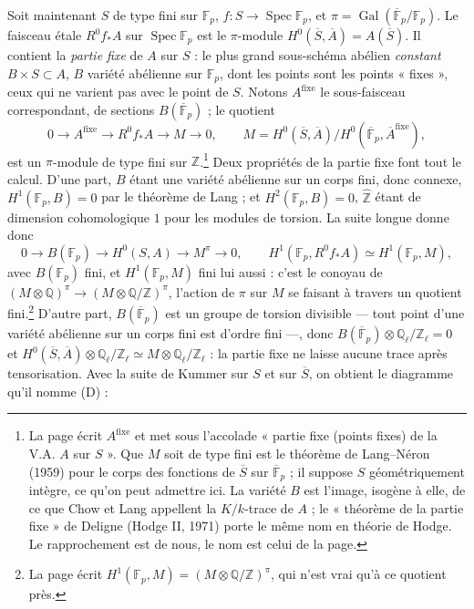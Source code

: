 \documentclass[11pt,a4paper]{article}
\begin{document}
Soit maintenant $S$ de type fini sur $\mathbb{F}_{p}$, $f \colon S \to
\operatorname{Spec}\mathbb{F}_{p}$, et $\pi = \operatorname{Gal}(
\overline{\mathbb{F}}_{p}/\mathbb{F}_{p})$. Le faisceau étale $R^{0}f_{*}A$ sur
$\operatorname{Spec}\mathbb{F}_{p}$ est le $\pi$-module $H^{0}(\overline{S},
\overline{A}) = A(\overline{S})$. Il contient la \emph{partie fixe} de $A$ sur
$S$ : le plus grand sous-schéma abélien \emph{constant} $B \times S \subset A$,
$B$ variété abélienne sur $\mathbb{F}_{p}$, dont les points sont les points
« fixes », ceux qui ne varient pas avec le point de $S$. Notons
$A^{\mathrm{fixe}}$ le sous-faisceau correspondant, de sections
$B(\overline{\mathbb{F}}_{p})$ ;
le quotient
\[
0 \longrightarrow A^{\mathrm{fixe}} \longrightarrow R^{0}f_{*}A \longrightarrow M
\longrightarrow 0 ,
\qquad
M = H^{0}(\overline{S}, \overline{A})/H^{0}(\overline{\mathbb{F}}_{p},
\overline{A}^{\mathrm{fixe}}) ,
\]
est un $\pi$-module de type fini sur $\mathbb{Z}$.\footnote{La page écrit
$A^{\mathrm{fixe}}$ et met sous l'accolade « partie fixe (points fixes) de la
V.A. $A$ sur $S$ ». Que $M$ soit de type fini est le théorème de Lang--Néron
(1959) pour le corps des fonctions de $\overline{S}$ sur
$\overline{\mathbb{F}}_{p}$ ; il suppose $S$ géométriquement intègre, ce
qu'on peut admettre ici. La variété $B$ est l'image, isogène à elle, de ce que
Chow et Lang appellent la $K/k$-trace de $A$ ; le « théorème de la partie
fixe » de Deligne (Hodge II, 1971) porte le même nom en théorie de Hodge. Le
rapprochement est de nous, le nom est celui de la page.} Deux propriétés de
la partie fixe font tout le calcul. D'une part, $B$ étant une variété
abélienne sur un corps fini, donc connexe, $H^{1}(\mathbb{F}_{p}, B) = 0$ par
le théorème de Lang ; et $H^{2}(\mathbb{F}_{p}, B) = 0$, $\hat{\mathbb{Z}}$
étant de dimension cohomologique $1$ pour les modules de torsion. La suite
longue donne donc
\[
0 \to B(\mathbb{F}_{p}) \to H^{0}(S, A) \to M^{\pi} \to 0 ,
\qquad
H^{1}(\mathbb{F}_{p}, R^{0}f_{*}A) \simeq H^{1}(\mathbb{F}_{p}, M) ,
\]
avec $B(\mathbb{F}_{p})$ fini, et $H^{1}(\mathbb{F}_{p}, M)$ fini lui aussi : c'est
le conoyau de $(M \otimes \mathbb{Q})^{\pi} \to (M \otimes \mathbb{Q}/\mathbb{Z})^{\pi}$,
l'action de $\pi$ sur $M$ se faisant à travers un quotient fini.\footnote{La
page écrit $H^{1}(\mathbb{F}_{p}, M) = (M \otimes \mathbb{Q}/\mathbb{Z})^{\pi}$,
qui n'est vrai qu'à ce quotient près.} D'autre part, $B(\overline{\mathbb{F}}_{p})$ est un groupe de
torsion divisible --- tout point d'une variété abélienne sur un corps fini est
d'ordre fini ---, donc $B(\overline{\mathbb{F}}_{p}) \otimes
\mathbb{Q}_{\ell}/\mathbb{Z}_{\ell} = 0$ et $H^{0}(\overline{S}, \overline{A})
\otimes \mathbb{Q}_{\ell}/\mathbb{Z}_{\ell} \simeq M \otimes
\mathbb{Q}_{\ell}/\mathbb{Z}_{\ell}$ : la partie fixe ne laisse aucune trace
après tensorisation. Avec la suite de Kummer sur $S$ et sur $\overline{S}$, on
obtient le diagramme qu'il nomme (D) :
\end{document}
